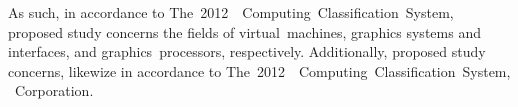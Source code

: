As such, in accordance to The~2012~\dvttermacm ~Computing~Classification~System, proposed study concerns the fields of virtual~machines, graphics systems and interfaces,  and graphics~processors, respectively. Additionally, proposed study concerns, likewize in accordance to The~2012~\dvttermacm ~Computing~Classification~System, \dvttermintel ~Corporation.

